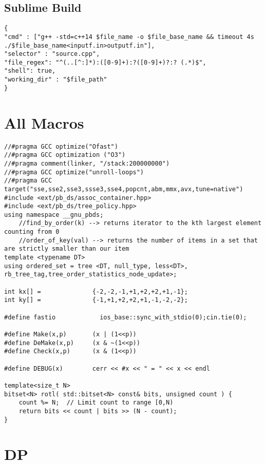 \documentclass[10pt,a4paper,onesided]{article}
\begin{document}
\begin{multicols*}{3}
\tableofcontents
\newpage
{}
\subsection*{Sublime Build}
    \begin{lstlisting}
{
"cmd" : ["g++ -std=c++14 $file_name -o $file_base_name && timeout 4s ./$file_base_name<inputf.in>outputf.in"], 
"selector" : "source.cpp",
"file_regex": "^(..[^:]*):([0-9]+):?([0-9]+)?:? (.*)$",
"shell": true,
"working_dir" : "$file_path"
}
    \end{lstlisting}
\section{All Macros}
\begin{lstlisting}
//#pragma GCC optimize("Ofast")
//#pragma GCC optimization ("O3")
//#pragma comment(linker, "/stack:200000000")
//#pragma GCC optimize("unroll-loops")
//#pragma GCC target("sse,sse2,sse3,ssse3,sse4,popcnt,abm,mmx,avx,tune=native")
#include <ext/pb_ds/assoc_container.hpp>
#include <ext/pb_ds/tree_policy.hpp>
using namespace __gnu_pbds;
    //find_by_order(k) --> returns iterator to the kth largest element counting from 0
    //order_of_key(val) --> returns the number of items in a set that are strictly smaller than our item
template <typename DT> 
using ordered_set = tree <DT, null_type, less<DT>, rb_tree_tag,tree_order_statistics_node_update>;

int kx[] =              {-2,-2,-1,+1,+2,+2,+1,-1};
int ky[] =              {-1,+1,+2,+2,+1,-1,-2,-2};

#define fastio            ios_base::sync_with_stdio(0);cin.tie(0);

#define Make(x,p)       (x | (1<<p))
#define DeMake(x,p)     (x & ~(1<<p))
#define Check(x,p)      (x & (1<<p))

#define DEBUG(x)        cerr << #x << " = " << x << endl

template<size_t N>
bitset<N> rotl( std::bitset<N> const& bits, unsigned count ) {
    count %= N;  // Limit count to range [0,N)
    return bits << count | bits >> (N - count);
}\end{lstlisting}
\section{DP}

\end{multicols*}
\end{document}
